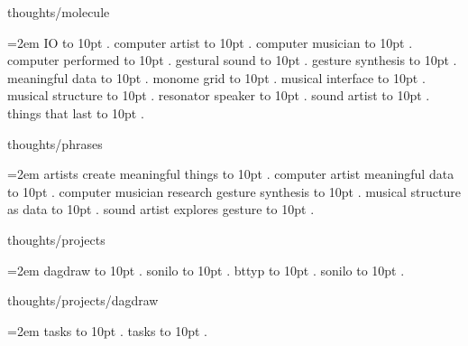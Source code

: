 thoughts/molecule
\par\begingroup
\leftskip=2em
\smallskip
\medskip
IO \leaders\hbox to 10pt {\hss.\hss}  \hfill {}
\smallskip
computer artist \leaders\hbox to 10pt {\hss.\hss}  \hfill {}
\smallskip
computer musician \leaders\hbox to 10pt {\hss.\hss}  \hfill {}
\smallskip
computer performed \leaders\hbox to 10pt {\hss.\hss}  \hfill {}
\smallskip
gestural sound \leaders\hbox to 10pt {\hss.\hss}  \hfill {}
\smallskip
gesture synthesis \leaders\hbox to 10pt {\hss.\hss}  \hfill {}
\smallskip
meaningful data \leaders\hbox to 10pt {\hss.\hss}  \hfill {}
\smallskip
monome grid \leaders\hbox to 10pt {\hss.\hss}  \hfill {}
\smallskip
musical interface \leaders\hbox to 10pt {\hss.\hss}  \hfill {}
\smallskip
musical structure \leaders\hbox to 10pt {\hss.\hss}  \hfill {}
\smallskip
resonator speaker \leaders\hbox to 10pt {\hss.\hss}  \hfill {}
\smallskip
sound artist \leaders\hbox to 10pt {\hss.\hss}  \hfill {}
\smallskip
things that last \leaders\hbox to 10pt {\hss.\hss}  \hfill {}
\smallskip
\par\endgroup
\bigskip
{}
thoughts/phrases
\par\begingroup
\leftskip=2em
\smallskip
\medskip
artists create meaningful things \leaders\hbox to 10pt {\hss.\hss}  \hfill {}
\smallskip
computer artist meaningful data \leaders\hbox to 10pt {\hss.\hss}  \hfill {}
\smallskip
computer musician research gesture synthesis \leaders\hbox to 10pt {\hss.\hss}  \hfill {}
\smallskip
musical structure as data \leaders\hbox to 10pt {\hss.\hss}  \hfill {}
\smallskip
sound artist explores gesture \leaders\hbox to 10pt {\hss.\hss}  \hfill {}
\smallskip
\par\endgroup
\bigskip
{}
thoughts/projects
\par\begingroup
\leftskip=2em
\smallskip
dagdraw \leaders\hbox to 10pt {\hss.\hss}  \hfill {}
\smallskip
sonilo \leaders\hbox to 10pt {\hss.\hss}  \hfill {}
\smallskip
\medskip
bttyp \leaders\hbox to 10pt {\hss.\hss}  \hfill {}
\smallskip
sonilo \leaders\hbox to 10pt {\hss.\hss}  \hfill {}
\smallskip
\par\endgroup
\bigskip
{}
thoughts/projects/dagdraw
\par\begingroup
\leftskip=2em
\smallskip
tasks \leaders\hbox to 10pt {\hss.\hss}  \hfill {}
\smallskip
\medskip
tasks \leaders\hbox to 10pt {\hss.\hss}  \hfill {}
